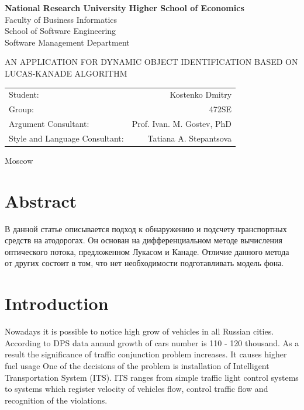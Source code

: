 \documentclass[12pt,a4paper,oneside,titlepage]{article}
\author{Kostenko}
\begin{document}
{
\thispagestyle{empty}
\newpage
\centering

\textbf{
National Research University Higher School of Economics\\
}
Faculty of Business Informatics\\
School of Software Engineering\\
Software Management Department

\vfill


\begin{large}
\MakeTextUppercase{
An Application for Dynamic Object Identification Based on Lucas-Kanade Algorithm
}
\end{large}


\vfill

\begin{tabular}{lr}
Student: & Kostenko Dmitry \\
Group: & 472SE \\
Argument Consultant: & Prof. Ivan. M. Gostev, PhD \\
Style and Language Consultant: & Tatiana A. Stepantsova
\end{tabular}

\vspace{\fill}

Moscow\\ \number\year
\clearpage
}

\section*{Abstract}
{
В данной статье описывается подход к обнаружению и подсчету транспортных средств на атодорогах.
Он основан на дифференциальном методе вычисления оптического потока, предложенном Лукасом и Канаде.
Отличие данного метода от других состоит в том, что нет необходимости подготавливать модель фона.
}









{
\newpage
\centering
\tableofcontents
}











\newpage
\section{Introduction}
Nowadays it is possible to notice high grow of vehicles in all Russian cities.
According to DPS data annual growth of cars number is 110 - 120 thousand.
As a result the significance of traffic conjunction problem increases.
It causes higher fuel usage 
One of the decisions of the problem is installation of Intelligent Transportation System (ITS).
ITS ranges from simple traffic light control systems to systems which register velocity of vehicles flow, control traffic flow and recognition of the violations.
\end{document}
